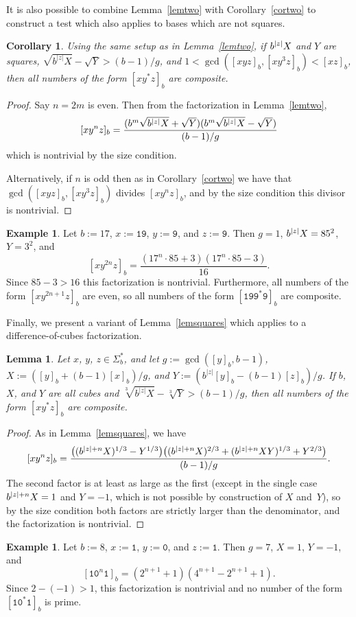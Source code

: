 \documentclass[12pt]{article}
\DeclarePairedDelimiter\abs{\lvert}{\rvert}
\theoremstyle{plain}
\newtheorem{corollary}[theorem]{Corollary}
\newtheorem{lemma}[theorem]{Lemma}
\theoremstyle{definition}
\newtheorem{example}[theorem]{Example}
\theoremstyle{remark}
\newcommand{\0}{\mathtt{0}}
\newcommand{\1}{\mathtt{1}}
\newcommand{\2}{\mathtt{2}}
\newcommand{\3}{\mathtt{3}}
\newcommand{\4}{\mathtt{4}}
\newcommand{\5}{\mathtt{5}}
\newcommand{\6}{\mathtt{6}}
\newcommand{\7}{\mathtt{7}}
\newcommand{\8}{\mathtt{8}}
\newcommand{\9}{\mathtt{9}}
\begin{document}
It is also possible to combine Lemma~\ref{lemtwo} with Corollary~\ref{cortwo} 
to construct a test which also applies to bases which are not squares.
\begin{corollary}
Using the same setup as in Lemma~\ref{lemtwo}, if\/ $b^{\abs{z}}X$ and $Y$ 
are squares, $\sqrt{b^{\lvert z\rvert}X}-\sqrt{Y}>(b-1)/g$, and
$1<\gcd([xyz]_b,[xy^3z]_b)<[xz]_b$, then all numbers of the form $[xy^*z]_b$ 
are composite.
\end{corollary}
\begin{proof}
Say $n=2m$ is even.  Then from the factorization in Lemma~\ref{lemtwo},
\[ [xy^nz]_b = \frac{(b^m\sqrt{b^{\abs{z}}X}+\sqrt{Y})(b^m\sqrt{b^{\abs{z}}X}-\sqrt{Y})}{(b-1)/g} \]
which is nontrivial by the size condition.

Alternatively, if $n$ is odd then as in Corollary~\ref{cortwo} we have that 
$\gcd([xyz]_b,[xy^3z]_b)$ divides $[xy^nz]_b$, and by the size condition this 
divisor is nontrivial.
\end{proof}
\begin{example}
Let $b:=17$, $x:=\1\9$, $y:=\9$, and $z:=\9$.  Then $g=1$, 
$b^{\abs{z}}X=85^2$, $Y=3^2$, and
\[ [xy^{2n}z]_b = \frac{(17^n\cdot85+3)(17^n\cdot85-3)}{16} . \]
Since $85-3>16$ this factorization is nontrivial.  Furthermore, all numbers 
of the form $[xy^{2n+1}z]_b$ are even, so all numbers of the form 
$[\1\9\9^*\9]_b$ are composite.
\end{example}
Finally, we present a variant of Lemma~\ref{lemsquares} which applies to a 
difference-of-cubes factorization.
\begin{lemma}\label{lemcubes}
Let $x$, $y$, $z\in\Sigma^*_b$, and let $g:=\gcd([y]_b,b-1)$, 
$X:=([y]_b+(b-1)[x]_b)/g$, and $Y:=(b^{\lvert{z}\rvert}[y]_b-(b-1)[z]_b)/g$.
If\/ $b$, $X$, and $Y$ are all cubes and 
$\sqrt[3]{b^{\lvert z\rvert}X}-\sqrt[3]{Y}>(b-1)/g$, then all numbers of 
the form
 $[xy^*z]_b$ are composite.
\end{lemma}
\begin{proof}
As in Lemma~\ref{lemsquares}, we have
\[ [xy^nz]_b = \frac{\bigl((b^{\abs{z}+n}X)^{1/3}-Y^{1/3}\bigr)\bigl((b^{\abs{z}+n}X)^{2/3}+(b^{\abs{z}+n}XY)^{1/3}+Y^{2/3}\bigr)}{(b-1)/g} . \]
The second factor is at least as large as the first (except in the 
single case $b^{\abs{z}+n}X=1$ and $Y=-1$, which is not possible by 
construction of $X$ and~$Y$),
so by the size condition both factors are strictly larger than the 
denominator, and the factorization is nontrivial.
\end{proof}
\begin{example}
Let $b:=8$, $x:=\1$, $y:=\0$, and $z:=\1$.  Then $g=7$, $X=1$, $Y=-1$, and
\[ [\1\0^n\1]_b = (2^{n+1}+1)(4^{n+1}-2^{n+1}+1) . \]
Since $2-(-1)>1$, this factorization is nontrivial and no number of the 
form $[\1\0^*\1]_b$ is prime.
\end{example}
\end{document}
